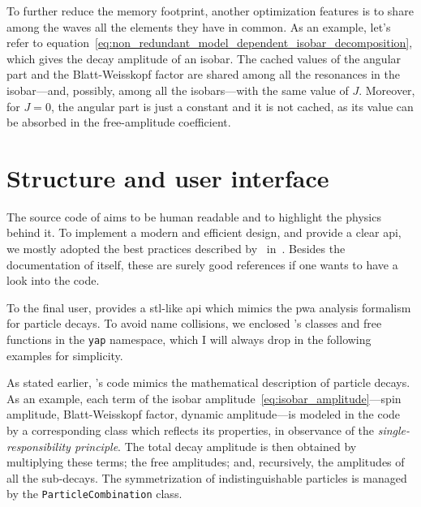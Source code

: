     To further reduce the memory footprint, another optimization  features is to share among the waves all the elements they have in common.
    As an example, let's refer to equation~\eqref{eq:non_redundant_model_dependent_isobar_decomposition}, which gives the decay amplitude of an isobar.
    The cached values of the angular part and the Blatt-Weisskopf factor are shared among all the resonances in the isobar---and, possibly, among all the isobars---with the same value of $J$.
    Moreover, for $J = 0$, the angular part is just a constant and it is not cached, as its value can be absorbed in the free-amplitude coefficient.


    \section{Structure and user interface}

    The source code of  aims to be human readable and to highlight the physics behind it.
    To implement a modern and efficient design, and provide a clear \ac{api}, we mostly adopted the best practices described by~\citeauthor{stl_meyers} in~\cite{stl_meyers,effective_cpp_meyers,effective_modern_cpp_meyers}.
    Besides the documentation of  itself, these are surely good references if one wants to have a look into the code.


    To the final user,  provides a \ac{stl}-like \ac{api} which mimics the \ac{pwa} analysis formalism for particle decays.
    To avoid name collisions, we enclosed 's classes and free functions in the \lstinline!yap! namespace, which I will always drop in the following examples for simplicity.


    As stated earlier, 's code mimics the mathematical description of particle decays.
    As an example, each term of the isobar amplitude~\eqref{eq:isobar_amplitude}---spin amplitude, Blatt-Weisskopf factor, dynamic amplitude---is modeled in the code by a corresponding class which reflects its properties, in observance of the \emph{single-responsibility principle}.
    The total decay amplitude is then obtained by multiplying these terms; the free amplitudes; and, recursively, the amplitudes of all the sub-decays.
    The symmetrization of indistinguishable particles is managed by the \lstinline!ParticleCombination! class.



